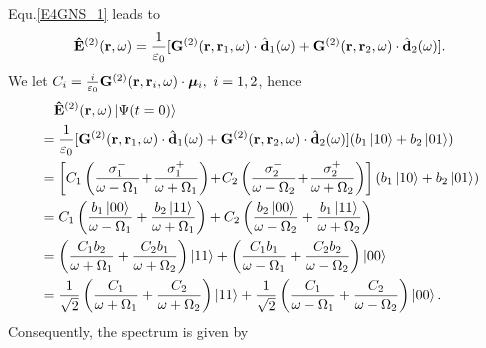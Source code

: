 Equ.\eqref{E4GNS_1} leads to
\begin{equation}
\mathbf{\hat{E}}^{(2)}({\bf r},\omega) =\frac{1}{\varepsilon_0}[\mathbf{G}^{(2)}(\mathbf{r},\mathbf{r}_1,\omega)\cdot \hat{\mathbf{d}}_1(\omega) + \mathbf{G}^{(2)}(\mathbf{r},\mathbf{r}_2,\omega)\cdot \hat{\mathbf{d}}_2(\omega)].
\end{equation}
We let $C_i=\frac{i}{\varepsilon_0}\mathbf{G}^{(2)}(\mathbf{r},\mathbf{r}_i,\omega)\cdot {\bm \mu}_i,\,\, i=1,2$, hence
\begin{align}
\!\!\!\! &\quad \mathbf{\hat{E}}^{(2)}({\bf r},\omega)\ket{\Psi(t=0)} \nonumber \\ &=\frac{1}{\varepsilon_0}[\mathbf{G}^{(2)}(\br,\br_1,\omega)\cdot \hat{\mathbf{d}}_1(\omega) + \mathbf{G}^{(2)}(\br,\br_2,\omega)\cdot \hat{\mathbf{d}}_2(\omega)](b_1\ket{10}+b_2\ket{01})\nonumber \nonumber \\
&= \left[C_1 \left( \frac{\sigm_1}{\omega-\Omega_1} \! + \! \frac{\sigp_1}{\omega + \Omega_1}\right) \! + \! C_2\left( \frac{\sigm_2}{\omega-\Omega_2} \! + \! \frac{\sigp_2}{\omega + \Omega_2} \right) \right](b_1\ket{10}+b_2\ket{01}) \nonumber \\
&= C_1\left( \frac{b_1\ket{00}}{\omega-\Omega_1} + \frac{b_2\ket{11}}{\omega + \Omega_1}\right) + C_2\left( \frac{b_2\ket{00}}{\omega-\Omega_2} + \frac{b_1\ket{11}}{\omega + \Omega_2} \right)\\
&= \left( \frac{C_1 b_2}{\omega+\Omega_1}+ \frac{C_2 b_1}{\omega+\Omega_2} \right)\ket{11} + \left( \frac{C_1 b_1}{\omega-\Omega_1}+ \frac{C_2 b_2}{\omega-\Omega_2} \right)\ket{00}\\
&= \frac{1}{\sqrt{2}}\left( \frac{C_1}{\omega+\Omega_1}+ \frac{C_2 }{\omega+\Omega_2} \right)\ket{11} + \frac{1}{\sqrt{2}} \left( \frac{C_1}{\omega-\Omega_1}+ \frac{C_2}{\omega-\Omega_2} \right)\ket{00}.
\end{align}
Consequently, the spectrum is given by

